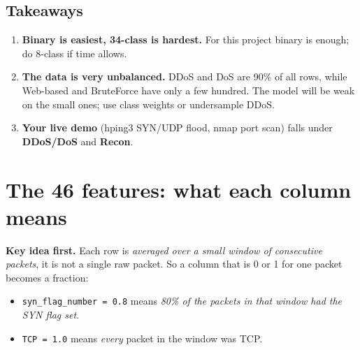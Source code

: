 \documentclass[11pt]{article}
\begin{document}
\vspace{12pt}
\subsection*{Takeaways}
\begin{enumerate}
\item \textbf{Binary is easiest, 34-class is hardest.} For this project binary is enough; do 8-class if time allows.
\item \textbf{The data is very unbalanced.} DDoS and DoS are 90\% of all rows, while Web-based and BruteForce have only a few hundred. The model will be weak on the small ones; use class weights or undersample DDoS.
\item \textbf{Your live demo} (hping3 SYN/UDP flood, nmap port scan) falls under \textbf{DDoS/DoS} and \textbf{Recon}.
\end{enumerate}

\newpage
\section*{The 46 features: what each column means}

\textbf{Key idea first.} Each row is \emph{averaged over a small window of consecutive packets}, it is not a single raw packet.
So a column that is 0 or 1 for one packet becomes a fraction:
\begin{itemize}
\item \texttt{syn\_flag\_number = 0.8} means \emph{80\% of the packets in that window had the SYN flag set}.
\item \texttt{TCP = 1.0} means \emph{every} packet in the window was TCP.
\end{itemize}
\end{document}
